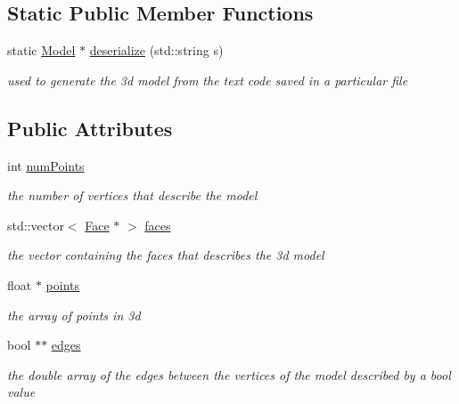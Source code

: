 \subsection*{Static Public Member Functions}
\begin{DoxyCompactItemize}
\item 
static \mbox{\hyperlink{class_model}{Model}} $\ast$ \mbox{\hyperlink{class_model_a98946d1c8d49b43f541dbd6b98b31e52}{deserialize}} (std\+::string s)
\begin{DoxyCompactList}\small\item\em used to generate the 3d model from the text code saved in a particular file \end{DoxyCompactList}\end{DoxyCompactItemize}
\subsection*{Public Attributes}
\begin{DoxyCompactItemize}
\item 
int \mbox{\hyperlink{class_model_a39ac6e91375d5ac5799a9845c3479d9c}{num\+Points}}
\begin{DoxyCompactList}\small\item\em the number of vertices that describe the model \end{DoxyCompactList}\item 
std\+::vector$<$ \mbox{\hyperlink{class_face}{Face}} $\ast$ $>$ \mbox{\hyperlink{class_model_a7752ae8e1bbacc53ed94d7bd9c404b6d}{faces}}
\begin{DoxyCompactList}\small\item\em the vector containing the faces that describes the 3d model \end{DoxyCompactList}\item 
float $\ast$ \mbox{\hyperlink{class_model_a6436acbcf42bece5621666fe37c71309}{points}}
\begin{DoxyCompactList}\small\item\em the array of points in 3d \end{DoxyCompactList}\item 
bool $\ast$$\ast$ \mbox{\hyperlink{class_model_a723a0c631c2ff688fed06c5652879ef7}{edges}}
\begin{DoxyCompactList}\small\item\em the double array of the edges between the vertices of the model described by a bool value \end{DoxyCompactList}\end{DoxyCompactItemize}


